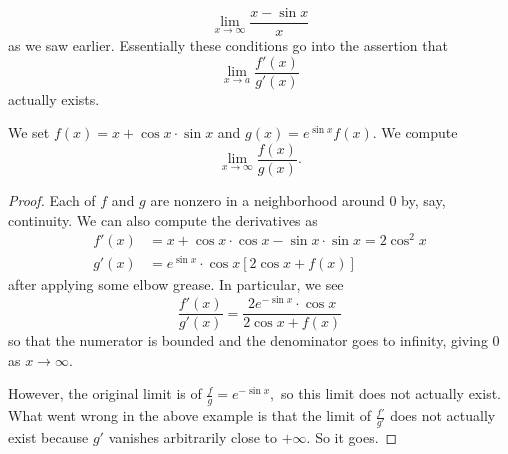 \[\lim_{x\to\infty}\frac{x-\sin x}x\]
as we saw earlier. Essentially these conditions go into the assertion that
\[\lim_{x\to a}\frac{f'(x)}{g'(x)}\]
actually exists.
\begin{exercise}
	We set $f(x)=x+\cos x\cdot\sin x$ and $g(x)=e^{\sin x}f(x).$ We compute
	\[\lim_{x\to\infty}\frac{f(x)}{g(x)}.\]
\end{exercise}
\begin{proof}
	Each of $f$ and $g$ are nonzero in a neighborhood around $0$ by, say, continuity. We can also compute the derivatives as
	\begin{align*}
		f'(x) &= x+\cos x\cdot\cos x-\sin x\cdot\sin x = 2\cos^2x \\
		g'(x) &= e^{\sin x}\cdot\cos x[2\cos x+f(x)]
	\end{align*}
	after applying some elbow grease. In particular, we see
	\[\frac{f'(x)}{g'(x)}=\frac{2e^{-\sin x}\cdot\cos x}{2\cos x+f(x)}\]
	so that the numerator is bounded and the denominator goes to infinity, giving $0$ as $x\to\infty.$

	However, the original limit is of $\frac fg=e^{-\sin x},$ so this limit does not actually exist. What went wrong in the above example is that the limit of $\frac{f'}{g'}$ does not actually exist because $g'$ vanishes arbitrarily close to $+\infty.$ So it goes.
\end{proof}

